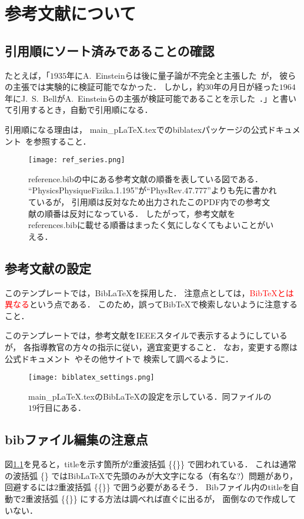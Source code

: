 \chapter{参考文献について}
\section{引用順にソート済みであることの確認}
たとえば，「$1935$年にA.~Einsteinらは後に量子論が不完全と主張した~\cite{PhysRev.47.777}が，
彼らの主張では実験的に検証可能でなかった．
しかし，約$30$年の月日が経った$1964$年にJ.~S.~BellがA.~Einsteinらの主張が検証可能であることを示した~\cite{PhysicsPhysiqueFizika.1.195}．」と書いて引用するとき，自動で引用順になる．

引用順になる理由は，
main\_pLaTeX.texでのbiblatexパッケージの公式ドキュメント~\cite{biblatex}を参照すること．

\begin{figure}[h]
  \centering
  \texttt{[image: ref\_series.png]}
  \caption{reference.bibの中にある参考文献の順番を表している図である．
  ``PhysicsPhysiqueFizika.1.195''が``PhysRev.47.777''よりも先に書かれているが，
  引用順は反対なため出力されたこのPDF内での参考文献の順番は反対になっている．
  したがって，参考文献をreferences.bibに載せる順番はまったく気にしなくてもよいことがいえる．}
  \label{fig:ref_series}
\end{figure}

\section{参考文献の設定}
このテンプレートでは，Bib\LaTeX を採用した．
注意点としては，\textcolor{red}{Bib\TeX とは異なる}という点である．
このため，誤ってBib\TeX で検索しないように注意すること．

このテンプレートでは，参考文献をIEEEスタイルで表示するようにしているが，
各指導教官の方々の指示に従い，適宜変更すること．
なお，変更する際は公式ドキュメント~\cite{biblatex}やその他サイトで
検索して調べるように．

\begin{figure}[h]
  \centering
  \texttt{[image: biblatex\_settings.png]}
  \caption{main\_pLaTeX.texのBib\LaTeX の設定を示している．同ファイルの$19$行目にある．}
  \label{fig:biblatex_settings}
\end{figure}

\section{bibファイル編集の注意点}
図\ref{fig:ref_series}を見ると，titleを示す箇所が$2$重波括弧 \{\{\}\} で囲われている．
これは通常の波括弧 \{\} ではBib\LaTeX で先頭のみが大文字になる（有名な?）問題があり，
回避するには$2$重波括弧 \{\{\}\} で囲う必要があるそう．
Bibファイル内のtitleを自動で$2$重波括弧 \{\{\}\} にする方法は調べれば直ぐに出るが，
面倒なので作成していない．
